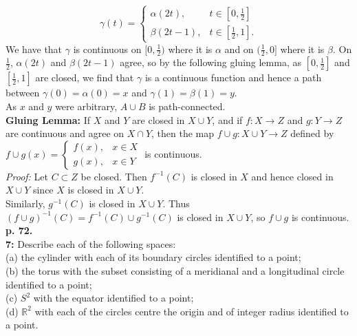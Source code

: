 \documentclass[a4paper]{article}
\begin{document}
    \[
    \gamma (t) = \begin{cases}
        \alpha(2t),& t \in \left[ 0, \frac{1}{2} \right] \\
        \beta (2t-1),& t \in \left[ \frac{1}{2},1 \right].
    \end{cases}
    \] 
    We have that $\gamma$ is continuous on $[0, \frac{1}{2})$ where it is
    $\alpha$ and on $(\frac{1}{2} , 0]$ where it is $\beta$. On
    $\frac{1}{2}$, $\alpha (2t)$ and $\beta(2t-1)$ agree, so by the following
    gluing
    lemma, as $\left[ 0,\frac{1}{2} \right] $ and $\left[ \frac{1}{2},1 \right]
    $ are
    closed, we find that $\gamma$ is a continuous function and hence a path
    between $\gamma(0) = \alpha(0) = x$ and $\gamma(1) = \beta(1) = y$.\\
    \linebreak
    As $x$ and $y$ were arbitrary, $A \cup B$ is path-connected.\\
    \textbf{Gluing Lemma:} If $X$ and $Y$ are closed in $X \cup Y$, and if
    $f  \colon X \to Z$ and $g  \colon Y\to Z$ are continuous and agree
    on $X \cap Y$, then 
    the map $f \cup g  \colon X \cup Y \to Z$ defined by
    $f\cup g (x) = \begin{cases}
        f(x),& x \in X\\
        g(x),& x \in Y
    \end{cases}$ is continuous.\\
    \linebreak
    \textit{Proof:} Let $C \subset Z$ be closed. Then $f^{-1}(C)$ is closed
    in $X$ and hence closed in $X \cup Y$ since $X$ is closed in $X \cup Y$.\\
    Similarly, $g^{-1}(C)$ is closed in $X \cup Y$. Thus
    $(f\cup g)^{-1}(C) = f^{-1}(C) \cup g^{-1}(C)$ is closed
    in $X \cup Y$, so $f \cup g$ is continuous.\\
    \linebreak
    \textbf{p. 72.}\\
    \textbf{7:} Describe each of the following spaces:\\
    (a) the cylinder with each of its boundary circles identified to a point;\\
    (b) the torus with the subset consisting of a meridianal and a longitudinal
    circle identified to a point;\\
    (c) $S^2$ with the equator identified to a point;\\
    (d) $\mathbb{R}^2$ with each of the circles centre the origin and of
    integer radius identified to a point.\\
\end{document}
